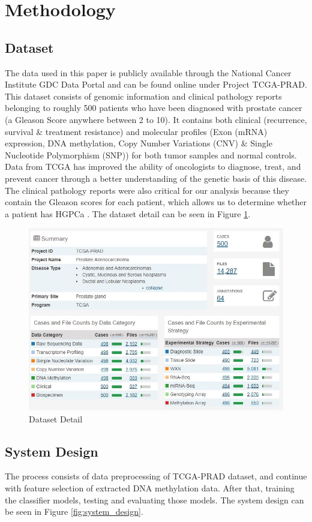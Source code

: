 \documentclass[a4paper,oneside]{article}
\begin{document}
\section{Methodology}
\subsection{Dataset}
The data used in this paper is publicly available through the National Cancer Institute GDC Data Portal and can be found online under Project TCGA-PRAD. This dataset consists of genomic information and clinical pathology reports belonging to roughly 500 patients who have been diagnosed with prostate cancer (a Gleason Score anywhere between 2 to 10). It contains both clinical (recurrence, survival \& treatment resistance) and molecular profiles (Exon (mRNA) expression, DNA methylation, Copy Number Variations (CNV) \& Single Nucleotide Polymorphism (SNP)) for both tumor samples and normal controls. Data from TCGA has improved the ability of oncologists to diagnose, treat, and prevent cancer through a better understanding of the genetic basis of this disease. The clinical pathology reports were also critical for our analysis because they contain the Gleason scores for each patient, which allows us to determine whether a patient has HGPCa \cite{two}. The dataset detail can be seen in Figure \ref{fig:dataset_detail}.

\begin{figure}
  \includegraphics[width=0.7\linewidth]{dataset_detail}
  \centering
  \caption{Dataset Detail}
  \label{fig:dataset_detail}
\end{figure}

\subsection{System Design}
The process consists of data preprocessing of TCGA-PRAD dataset, and continue with feature selection of extracted DNA methylation data. After that, training the classifier models, testing and evaluating those models. The system design can be seen in Figure \ref{fig:system_design}.
\end{document}
